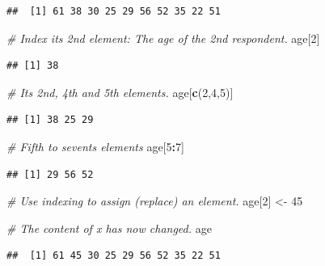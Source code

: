 \documentclass[
]{book}
\newenvironment{Shaded}{\begin{snugshade}}{\end{snugshade}}
\newcommand{\CommentTok}[1]{\textcolor[rgb]{0.56,0.35,0.01}{\textit{#1}}}
\newcommand{\DecValTok}[1]{\textcolor[rgb]{0.00,0.00,0.81}{#1}}
\newcommand{\FunctionTok}[1]{\textcolor[rgb]{0.13,0.29,0.53}{\textbf{#1}}}
\newcommand{\NormalTok}[1]{#1}
\newcommand{\OtherTok}[1]{\textcolor[rgb]{0.56,0.35,0.01}{#1}}
\newcommand{\SpecialCharTok}[1]{\textcolor[rgb]{0.81,0.36,0.00}{\textbf{#1}}}
\begin{document}
\begin{verbatim}
##  [1] 61 38 30 25 29 56 52 35 22 51
\end{verbatim}

\begin{Shaded}
\begin{Highlighting}[]
\CommentTok{\# Index its 2nd element: The age of the 2nd respondent.}
\NormalTok{age[}\DecValTok{2}\NormalTok{]}
\end{Highlighting}
\end{Shaded}

\begin{verbatim}
## [1] 38
\end{verbatim}

\begin{Shaded}
\begin{Highlighting}[]
\CommentTok{\# Its 2nd, 4th and 5th elements.}
\NormalTok{age[}\FunctionTok{c}\NormalTok{(}\DecValTok{2}\NormalTok{,}\DecValTok{4}\NormalTok{,}\DecValTok{5}\NormalTok{)]}
\end{Highlighting}
\end{Shaded}

\begin{verbatim}
## [1] 38 25 29
\end{verbatim}

\begin{Shaded}
\begin{Highlighting}[]
\CommentTok{\# Fifth to sevents elements}
\NormalTok{age[}\DecValTok{5}\SpecialCharTok{:}\DecValTok{7}\NormalTok{]}
\end{Highlighting}
\end{Shaded}

\begin{verbatim}
## [1] 29 56 52
\end{verbatim}

\begin{Shaded}
\begin{Highlighting}[]
\CommentTok{\# Use indexing to assign (replace) an element.}
\NormalTok{age[}\DecValTok{2}\NormalTok{] }\OtherTok{\textless{}{-}} \DecValTok{45}

\CommentTok{\# The content of x has now changed.}
\NormalTok{age}
\end{Highlighting}
\end{Shaded}

\begin{verbatim}
##  [1] 61 45 30 25 29 56 52 35 22 51
\end{verbatim}
\end{document}
